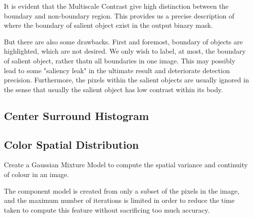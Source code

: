 \documentclass[10pt,twocolumn,letterpaper]{article}
\begin{document}
It is evident that the Multiscale Contrast give high distinction between the boundary and non-boundary region. 
This provides us a precise description of where the boundary of salient object exist in the output binary mask.

But there are also some drawbacks. First and foremost, boundary of objects are highlighted, which are not desired.
We only wish to label, at most, the boundary of salient object, rather thatn all boundaries in one image. 
This may possibly lead to some "saliency leak" in the ultimate result and deteriorate detection precision.
Furthermore, the pixels within the salient objects are usually ignored in the sense that 
usually the salient object has low contrast within its body.
\subsection{Center Surround Histogram}

\subsection{Color Spatial Distribution}
    Create a Gaussian Mixture Model to compute the spatial variance and continuity of colour in an image.

    The component model is created from only a subset of the pixels in the image, and the maximum number of iterations is limited in order to reduce the time taken to compute this feature without sacrificing too much accuracy.
\end{document}

